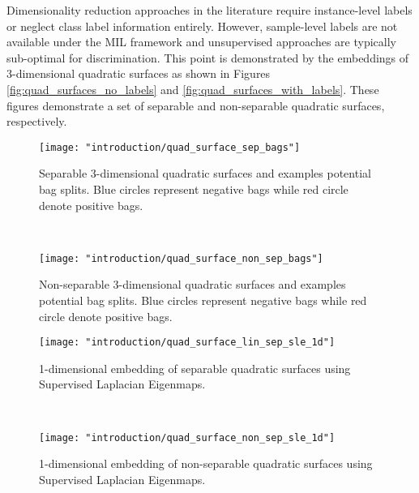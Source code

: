 Dimensionality reduction approaches in the literature require instance-level labels or neglect class label information entirely. However, sample-level labels are not available under the MIL framework and unsupervised approaches are typically sub-optimal for discrimination.  This point is demonstrated by the embeddings of 3-dimensional quadratic surfaces as shown in Figures \ref{fig:quad_surfaces_no_labels} and \ref{fig:quad_surfaces_with_labels}.  These figures demonstrate a set of separable and non-separable quadratic surfaces, respectively. 
 \begin{figure*}[t!]
 	\centering
 	\begin{subfigure}[t]{0.5\textwidth}
 		\centering
 		\texttt{[image: "introduction/quad\_surface\_sep\_bags"]}
 		\caption{Separable 3-dimensional quadratic surfaces and examples potential bag splits.  Blue circles represent negative bags while red circle denote positive bags.}
 		\label{fig:quad_surface_sep_bags}
 	\end{subfigure}%
 	~ 
 	\begin{subfigure}[t]{0.5\textwidth}
 		\centering
 		\texttt{[image: "introduction/quad\_surface\_non\_sep\_bags"]}
 		\caption{Non-separable 3-dimensional quadratic surfaces and examples potential bag splits. Blue circles represent negative bags while red circle denote positive bags.}
 		\label{fig:quad_surface_non_sep_bags}
 	\end{subfigure}
 	
 	
 	\begin{subfigure}[t]{0.5\textwidth}
 		\centering
 		\texttt{[image: "introduction/quad\_surface\_lin\_sep\_sle\_1d"]}
 		\caption{1-dimensional embedding of separable quadratic surfaces using Supervised Laplacian Eigenmaps.}
 		\label{fig:quad_surface_lin_sep_sle_1d}
 	\end{subfigure}%
 	~ 
 	\begin{subfigure}[t]{0.5\textwidth}
 		\centering
 		\texttt{[image: "introduction/quad\_surface\_non\_sep\_sle\_1d"]}
 		\caption{1-dimensional embedding of non-separable quadratic surfaces using Supervised Laplacian Eigenmaps.}
 		\label{fig:quad_surface_non_sep_sle_1d}
 	\end{subfigure}
 	\caption[Supervised embedding of quadratic surfaces]{Embedding of quadratic surfaces using Supervised Laplacian Eigenmaps.}
 	\label{fig:quad_surfaces_with_labels}%
 \end{figure*} 
